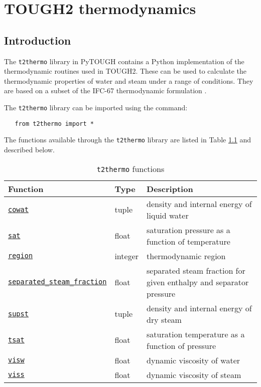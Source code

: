 \chapter{TOUGH2 thermodynamics}
\label{t2thermo}

\section{Introduction}
The \texttt{t2thermo} library in PyTOUGH contains a Python implementation of the thermodynamic routines used in TOUGH2.  These can be used to calculate the thermodynamic properties of water and steam under a range of conditions.  They are based on a subset of the IFC-67 thermodynamic formulation \citep{IFC_67}.

The \texttt{t2thermo} library can be imported using the command:

\begin{lstlisting} 
   from t2thermo import *
\end{lstlisting}

The functions available through the \texttt{t2thermo} library are listed in Table \ref{tb:t2thermo_functions} and described below.

\begin{table}
  \begin{center}
    \begin{tabular}{|l|l|p{65mm}|}
      \hline
      \textbf{Function} & \textbf{Type} & \textbf{Description}\\
      \hline
      \hyperref[sec:t2thermo:cowat]{\texttt{cowat}} & tuple & density and internal energy of liquid water\\
      \hyperref[sec:t2thermo:sat]{\texttt{sat}} & float & saturation pressure as a function of temperature\\
      \hyperref[sec:t2thermo:region]{\texttt{region}} & integer & thermodynamic region\\
      \hyperref[sec:t2thermo:separated_steam_fraction]{\texttt{separated\_steam\_fraction}} & float & separated steam fraction for given enthalpy and separator pressure\\
      \hyperref[sec:t2thermo:supst]{\texttt{supst}} & tuple & density and internal energy of dry steam\\
      \hyperref[sec:t2thermo:tsat]{\texttt{tsat}} & float & saturation temperature as a function of pressure\\
      \hyperref[sec:t2thermo:visw]{\texttt{visw}} & float & dynamic viscosity of water\\
      \hyperref[sec:t2thermo:viss]{\texttt{viss}} & float & dynamic viscosity of steam\\
      \hline
    \end{tabular}
    \caption{\texttt{t2thermo} functions}
    \label{tb:t2thermo_functions}
  \end{center}
\end{table}

